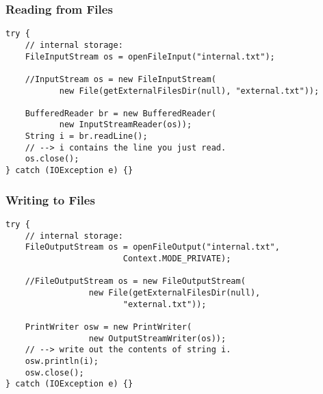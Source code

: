 \begin{frame}[fragile]
\frametitle{Reading from Files}
\begin{changemargin}{0.1cm}

\begin{lstlisting}[basicstyle=\scriptsize]
try {
    // internal storage: 
    FileInputStream os = openFileInput("internal.txt");
    
    //InputStream os = new FileInputStream(
           new File(getExternalFilesDir(null), "external.txt"));
           
    BufferedReader br = new BufferedReader(
           new InputStreamReader(os));
    String i = br.readLine();
    // --> i contains the line you just read.
    os.close();
} catch (IOException e) {}
\end{lstlisting}

\end{changemargin}
\end{frame}


\begin{frame}[fragile]
\frametitle{Writing to Files}
\begin{changemargin}{1cm}

\begin{lstlisting}[basicstyle=\scriptsize]
try {
    // internal storage:
    FileOutputStream os = openFileOutput("internal.txt", 
                        Context.MODE_PRIVATE);
                        
    //FileOutputStream os = new FileOutputStream(
                 new File(getExternalFilesDir(null), 
                        "external.txt"));

    PrintWriter osw = new PrintWriter(
                 new OutputStreamWriter(os));
    // --> write out the contents of string i.
    osw.println(i);
    osw.close();
} catch (IOException e) {}
\end{lstlisting}


\end{changemargin}
\end{frame}

